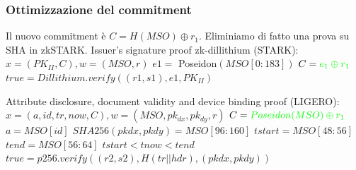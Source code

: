 \documentclass{beamer}
\begin{document}
\begin{frame}
\frametitle{Ottimizzazione del commitment}
Il nuovo commitment è $C = H(MSO) \oplus r_1$. Eliminiamo di fatto una prova su SHA in zkSTARK.\newline
Issuer's signature proof zk-dillithium (STARK):\newline
	$x = (PK_{II},C), w = (MSO,r)$\newline
	$e1 =$ Poseidon$(MSO[0 : 183])$\newline
	$C = \textcolor{green}{e_1 \oplus r_1}$\newline
	$true = Dillithium.verify((r1, s1), e1, PK_{II} )$\newline

Attribute disclosure, document validity and device binding proof (LIGERO):\newline
	$x = (a,id,tr,now,C), w = (MSO,pk_{dx},pk_{dy},r)$\newline
	$C = \textcolor{green}{Poseidon(MSO) \oplus r_1}$\newline
	$a = MSO[id]$\newline
	$SHA256(pkdx, pkdy) = MSO[96 : 160]$\newline
	$tstart = MSO[48 : 56]$\newline
	$tend = MSO[56 : 64]$\newline
	$tstart < tnow < tend$ \newline
	$true = p256.verify((r2, s2), H(tr||hdr), (pkdx, pkdy))$\newline
\end{frame}
\end{document}
